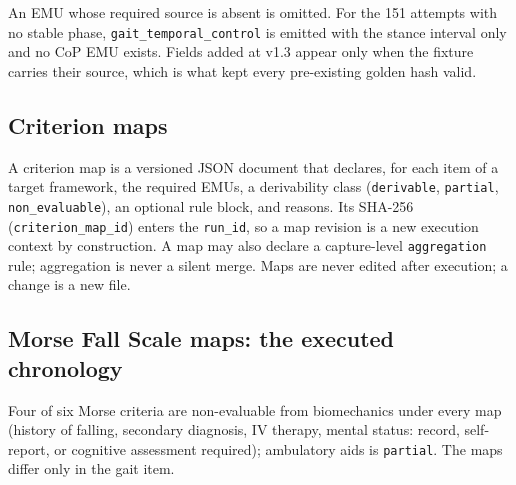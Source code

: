\documentclass[11pt]{article}
\begin{document}
An EMU whose required source is absent is omitted. For the 151 attempts with no stable phase, \texttt{gait\_temporal\_control} is emitted with the stance interval only and no CoP EMU exists. Fields added at v1.3 appear only when the fixture carries their source, which is what kept every pre-existing golden hash valid.

\subsection{Criterion maps}\label{criterion-maps}

A criterion map is a versioned JSON document that declares, for each item of a target framework, the required EMUs, a derivability class (\texttt{derivable}, \texttt{partial}, \texttt{non\_evaluable}), an optional rule block, and reasons. Its SHA-256 (\texttt{criterion\_map\_id}) enters the \texttt{run\_id}, so a map revision is a new execution context by construction. A map may also declare a capture-level \texttt{aggregation} rule; aggregation is never a silent merge. Maps are never edited after execution; a change is a new file.

\subsection{Morse Fall Scale maps: the executed chronology}\label{morse-fall-scale-maps-the-executed-chronology}

Four of six Morse criteria are non-evaluable from biomechanics under every map (history of falling, secondary diagnosis, IV therapy, mental status: record, self-report, or cognitive assessment required); ambulatory aids is \texttt{partial}. The maps differ only in the gait item.
\end{document}
